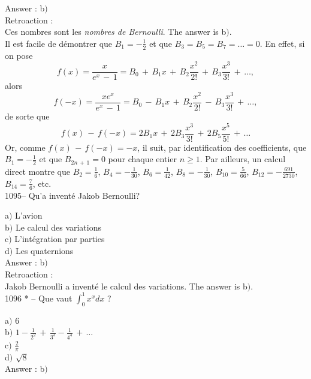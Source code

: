 ﻿\documentclass[letterpaper, 12pt]{article}
\begin{document}
Answer : b$)$\\

Retroaction : \\
Ces nombres sont les {\sl nombres de Bernoulli}. The answer is
b$)$. \\
Il est facile de d\'emontrer que $B_1=-\frac12$ et que
$B_3=B_5=B_7=\ldots=0$. En effet, si on pose
$$\displaystyle{f(x)=\frac
x{e^x\,-\,1}=B_0\,+\,B_1x\,+\,B_2\frac{x^2}{2!}\,+\,B_3\frac{x^3}{3!}\,+\,\ldots,}$$
alors
$$\displaystyle{f(-x)=\frac{xe^x}{e^x\,-\,1}=B_0\,-\,B_1x\,+\,B_2\frac{x^2}{2!}\,-\,B_3\frac{x^3}{3!}\,+\,\ldots,}$$
de sorte que
$$\displaystyle{f(x)\,-\,f(-x)=2B_1x\,+\,2B_3\frac{x^3}{3!}\,+\,2B_5\frac{x^5}{5!}\,+\,\ldots}$$
Or, comme $f(x)\,-\,f(-x)=-x$, il suit, par identification des
coefficients, que $B_1=-\frac12$ et que $B_{2n\,+\,1}=0$ pour chaque
entier $n\ge1$. Par ailleurs, un calcul direct montre que
$B_2=\frac16$, $B_4=-\frac1{30}$, $B_6=\frac1{42}$,
$B_8=-\frac1{30}$, $B_{10}=\frac5{66}$, $B_{12}=-\frac{691}{2730}$,
$B_{14}=\frac76$, etc.\\


1095-- Qu'a invent\'e Jakob Bernoulli?

a$)$ L'avion\\
b$)$ Le calcul des variations \\
c$)$ L'int\'egration par parties  \\
d$)$ Les quaternions  \\

Answer : b$)$\\

Retroaction : \\
Jakob Bernoulli a invent\'e le calcul des variations.
The answer is b$)$.\\

1096 * -- Que vaut $\int_0^1x^xdx$ ?

a$)$ $6$ \\ [2mm] b$)$
$1-\frac1{2^2}\,+\,\frac1{3^3}-\frac1{4^4}\,+\,\ldots$ \\ [3 mm]
c$)$ $\frac2{\pi}$  \\ [2mm]
d$)$ $\sqrt8$\\

Answer : b$)$\\
\end{document}
